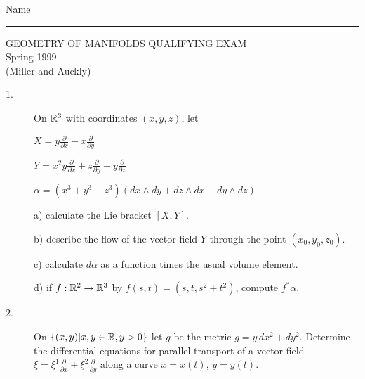 \documentclass[bbb]{report}
\def\ds{\displaystyle}
\def\R{{\Bbb R}}
\begin{document}

\begin{Large}
\hfill Name \rule{2.15in}{.01in}
\par
\vspace{.25in}

\begin{center}
   GEOMETRY OF MANIFOLDS QUALIFYING EXAM \\
   Spring 1999 \\
   (Miller and Auckly) \\
\end{center}

\end{Large}

\vspace{.1in}

\begin{large}

\vspace{.2in}

\begin{description}

\item[1.]
On $\R^3$ with coordinates $(x,y,z)$,  let

\item[\quad]  $X=y\ds\frac{\partial}{\partial x}
             -x\ds\frac{\partial}{\partial y}$
\item[\quad] $Y=x^2y\ds\frac{\partial}{\partial x}
             +z\ds\frac{\partial}{\partial y}
             + y\ds\frac{\partial}{\partial z}$
\item[\quad] $\alpha = (x^3+y^3+z^3)(dx\land dy+dz\land dx+dy\land dz)$

\vspace{.1in}
\item[\quad] a) calculate the Lie bracket $[X,Y]$.

\item[\quad] b) describe the flow of the vector field $Y$ through
the point $(x_0, y_0,z_0)$.

\item[\quad] c) calculate $d\alpha$ as a function times the usual
volume element.

\item[\quad] d) if $f:\R^2\to\R^3$ by $f(s,t)=(s,t,s^2+t^2)$,
compute $f^\ast\alpha$.

\vspace{.2in}
\item[2.]
On $\{(x,y)|x,y\in\R,y>0\}$ let $g$ be the metric
$g=y\,dx^2+dy^2$.
Determine the differential equations for parallel transport of a vector
field
$\xi=\xi^1\ds\frac{\partial}{\partial x}
+\xi^2\ds\frac{\partial}{\partial y}$ along a curve $x=x(t)$, $y=y(t)$.



\end{description}
\end{large}
\end{document}
